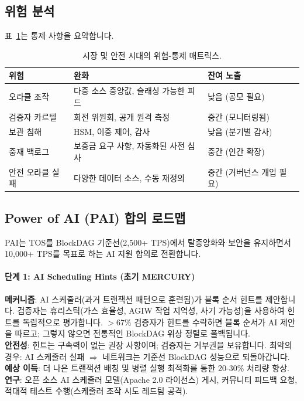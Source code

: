 \documentclass[11pt]{article}
\begin{document}
\subsection{위험 분석}
표~\ref{tab:risk-markets}는 통제 사항을 요약합니다.

\begin{table}[H]
  \centering
  \begin{tabular}{p{}p{}p{}}
    \toprule
    \textbf{위험} & \textbf{완화} & \textbf{잔여 노출} \\
    \midrule
    오라클 조작 & 다중 소스 중앙값, 슬래싱 가능한 피드 & 낮음 (공모 필요) \\
    검증자 카르텔 & 회전 위원회, 공개 원격 측정 & 중간 (모니터링됨) \\
    보관 침해 & HSM, 이중 제어, 감사 & 낮음 (분기별 감사) \\
    중재 백로그 & 보증금 요구 사항, 자동화된 사전 심사 & 중간 (인간 확장) \\
    안전 오라클 실패 & 다양한 데이터 소스, 수동 재정의 & 중간 (거버넌스 개입 필요) \\
    \bottomrule
  \end{tabular}
  \caption{시장 및 안전 시대의 위험-통제 매트릭스.}
  \label{tab:risk-markets}
\end{table}

\subsection{Power of AI (PAI) 합의 로드맵}
\label{sec:pai-roadmap}
PAI는 TOS를 BlockDAG 기준선(2,500+ TPS)에서 탈중앙화와 보안을 유지하면서 10,000+ TPS를 목표로 하는 AI 지원 합의로 전환합니다.

\paragraph{단계 1: AI Scheduling Hints (초기 MERCURY)}
\textbf{메커니즘}: AI 스케줄러(과거 트랜잭션 패턴으로 훈련됨)가 블록 순서 힌트를 제안합니다. 검증자는 휴리스틱(가스 효율성, AGIW 작업 지역성, 사기 가능성)을 사용하여 힌트를 독립적으로 평가합니다. $>67\%$ 검증자가 힌트를 수락하면 블록 순서가 AI 제안을 따르고; 그렇지 않으면 전통적인 BlockDAG 위상 정렬로 폴백됩니다.\\
\textbf{안전성}: 힌트는 구속력이 없는 권장 사항이며; 검증자는 거부권을 보유합니다. 최악의 경우: AI 스케줄러 실패 $\Rightarrow$ 네트워크는 기준선 BlockDAG 성능으로 되돌아갑니다.\\
\textbf{예상 이득}: 더 나은 트랜잭션 배칭 및 병렬 실행 최적화를 통한 20-30\% 처리량 향상.\\
\textbf{연구}: 오픈 소스 AI 스케줄러 모델(Apache 2.0 라이선스) 게시, 커뮤니티 피드백 요청, 적대적 테스트 수행(스케줄러 조작 시도 레드팀 공격).
\end{document}
